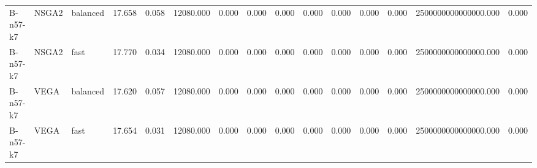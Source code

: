 \begin{table}
\begin{tabular}{lllrrrrrrrrrrrr}
B-n57-k7 & NSGA2 & balanced & 17.658 & 0.058 & 12080.000 & 0.000 & 0.000 & 0.000 & 0.000 & 0.000 & 0.000 & 0.000 & 2500000000000000.000 & 0.000 \\
B-n57-k7 & NSGA2 & fast & 17.770 & 0.034 & 12080.000 & 0.000 & 0.000 & 0.000 & 0.000 & 0.000 & 0.000 & 0.000 & 2500000000000000.000 & 0.000 \\
B-n57-k7 & VEGA & balanced & 17.620 & 0.057 & 12080.000 & 0.000 & 0.000 & 0.000 & 0.000 & 0.000 & 0.000 & 0.000 & 2500000000000000.000 & 0.000 \\
B-n57-k7 & VEGA & fast & 17.654 & 0.031 & 12080.000 & 0.000 & 0.000 & 0.000 & 0.000 & 0.000 & 0.000 & 0.000 & 2500000000000000.000 & 0.000 \\
\bottomrule
\end{tabular}
\end{table}

